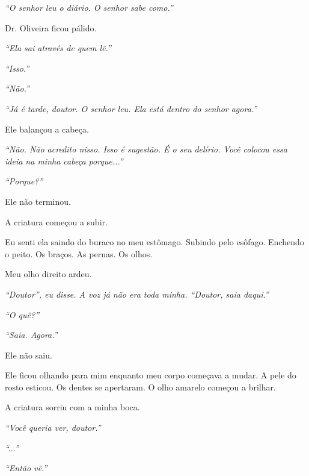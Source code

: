 \noindent \textit{\textquotedblleft{}O senhor leu o diário. O senhor sabe como.\textquotedblright{}}

\noindent Dr. Oliveira ficou pálido.

\noindent \textit{\textquotedblleft{}Ela sai através de quem lê.\textquotedblright{}}

\noindent \textit{\textquotedblleft{}Isso.\textquotedblright{}}

\noindent \textit{\textquotedblleft{}Não.\textquotedblright{}}

\noindent \textit{\textquotedblleft{}Já é tarde, doutor. O senhor leu. Ela está dentro do senhor agora.\textquotedblright{}}

\noindent Ele balançou a cabeça.

\noindent \textit{\textquotedblleft{}Não. Não acredito nisso. Isso é sugestão. É o seu delírio. Você colocou essa ideia na minha cabeça porque...\textquotedblright{}}

\noindent \textit{\textquotedblleft{}Porque?\textquotedblright{}}

\noindent Ele não terminou.

\noindent A criatura começou a subir.

\noindent Eu senti ela saindo do buraco no meu estômago. Subindo pelo esôfago. Enchendo o peito. Os braços. As pernas. Os olhos.

\noindent Meu olho direito ardeu.

\noindent \textit{\textquotedblleft{}Doutor\textquotedblright{}\textit{, eu disse. A voz já não era toda minha. }\textquotedblleft{}Doutor, saia daqui.\textquotedblright{}}

\noindent \textit{\textquotedblleft{}O quê?\textquotedblright{}}

\noindent \textit{\textquotedblleft{}Saia. Agora.\textquotedblright{}}

\noindent Ele não saiu.

\noindent Ele ficou olhando para mim enquanto meu corpo começava a mudar. A pele do rosto esticou. Os dentes se apertaram. O olho amarelo começou a brilhar.

\noindent A criatura sorriu com a minha boca.

\noindent \textit{\textquotedblleft{}Você queria ver, doutor.\textquotedblright{}}

\noindent \textit{\textquotedblleft{}...\textquotedblright{}}

\noindent \textit{\textquotedblleft{}Então vê.\textquotedblright{}}

